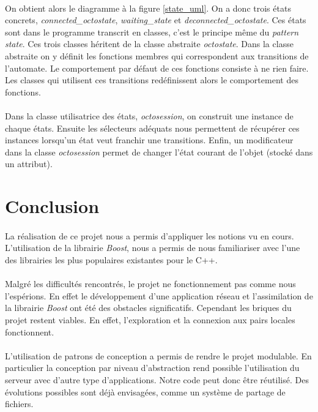 \documentclass[a4paper]{article}
\begin{document}
			\paragraph{}{
			On obtient alors le diagramme à la figure \ref{state_uml}. On a donc trois états concrets, \textit{connected\_octostate}, \textit{waiting\_state} et \textit{deconnected\_octostate}.
			Ces états sont dans le programme transcrit en classes, c'est le principe même du \textit{pattern
			state}. Ces trois classes héritent de la classe abstraite \textit{octostate}.
			Dans la classe abstraite on y définit les fonctions membres qui correspondent aux transitions de l'automate.
			Le comportement par défaut de ces fonctions consiste à ne rien faire. Les classes qui utilisent ces transitions
			redéfinissent alors le comportement des fonctions.
			}
			\paragraph{}{
			Dans la classe utilisatrice des états, \textit{octosession}, on construit une instance de chaque états.
			Ensuite les sélecteurs adéquats nous permettent de récupérer ces instances lorsqu'un état veut franchir 
			une transitions. \newline
			Enfin, un modificateur dans la classe \textit{octosession} permet de changer l'état courant de l'objet 
			(stocké dans un attribut). 
			}
			
	\newpage

	\section*{Conclusion}
		\paragraph{}{
		La réalisation de ce projet nous a permis d'appliquer les notions vu en cours.
		L'utilisation de la librairie \textit{Boost}, nous a permis de nous familiariser avec l'une des 
		librairies les plus populaires existantes pour le C++.
		}
		\paragraph{}{
		Malgré les difficultés rencontrés, le projet ne fonctionnement pas comme nous l'espérions.
		En effet le développement d'une application réseau et l'assimilation de la librairie \textit{Boost}
		ont été des obstacles significatifs. \newline
		Cependant les briques du projet restent viables. En effet, l'exploration et la connexion aux
		pairs locales fonctionnent.
		}
		\paragraph{}{
		L'utilisation de patrons de conception a permis de rendre le projet modulable.
		En particulier la conception par niveau d’abstraction rend possible l'utilisation du serveur avec
		d'autre type d'applications. Notre code peut donc être réutilisé. Des évolutions possibles sont
		déjà envisagées, comme un système de partage de fichiers.
		}
\end{document}
